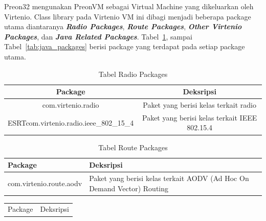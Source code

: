\documentclass[a4paper,twoside]{article}
\begin{document}
\begin{enumerate}
Preon32 mengunakan PreonVM sebagai Virtual Machine yang dikeluarkan oleh Virtenio. Class library pada Virtenio VM ini dibagi menjadi beberapa package utama diantaranya \textbf{\textit{Radio Packages}}, \textbf{\textit{Route Packages}}, \textbf{\textit{Other Virtenio Packages}}, dan \textbf{\textit{Java Related Packages}}. Tabel~\ref{tab:radio_packages}, sampai Tabel~\ref{tab:java_packages} berisi package yang terdapat pada setiap package utama.
		
\begin{table}[H] %
	\centering 
	\label{tab:radio_packages}
	\begin{tabular}{|c|c|}
		\toprule
		Package & Deksripsi \\

		\midrule
		com.virtenio.radio & Paket yang berisi kelas terkait radio \\
		ESRTcom.virtenio.radio.ieee\_802\_15\_4  & Paket yang berisi kelas terkait IEEE 802.15.4 \\

		\bottomrule
		
	\end{tabular} 
	\caption{Tabel Radio Packages}
\end{table}

\begin{table}[H] %
	\centering 
	\label{tab:route_packages}
	\begin{tabular}{|p{6cm}|p{10cm}|}
		\toprule
		Package & Deksripsi \\

		\midrule
		com.virtenio.route.aodv & Paket yang berisi kelas terkait AODV (Ad Hoc On Demand Vector) Routing \\

		\bottomrule
		
	\end{tabular} 
	\caption{Tabel Route Packages}
\end{table}

\begin{table}[H] %
	\centering 
	\label{tab:other_packages}
	\begin{tabular}{|p{6cm}|p{10cm}|}
		\toprule
		Package & Deksripsi \\


\end{tabular}
\end{table}
\end{enumerate}
\end{document}
